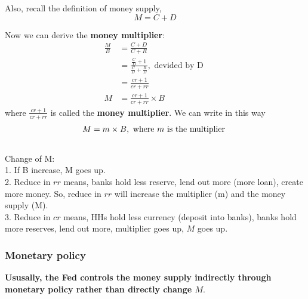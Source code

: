 \documentclass[12pt]{article}
\begin{document}
Also, recall the definition of money supply,
\begin{equation*}
M = C + D
\end{equation*}

Now we can derive the {\textbf {money multiplier}}:
\begin{align*}
\frac{M}{B} &= \frac{C + D}{C + R}\\
 &= \frac{ \frac{C}{D} + 1}{ \frac{C}{D} + \frac{R}{D}}, \text{ devided by D }\\
 &= \frac{cr + 1}{cr + rr}\\
M &= \frac{cr + 1}{cr + rr} \times B
\end{align*}
where $ \frac{cr + 1}{cr + rr} $ is called the {\textbf {money multiplier}}. We can
write in this way
\begin{equation*}
M = m  \times B, \text{ where $ m $ is the multiplier }
\end{equation*}
\noindent{}\\

Change of M:\\
1. If B increase, M goes up.\\
2. Reduce in $ rr $ means, banks hold less reserve, lend out more (more loan),
create more money. So, reduce in $ rr $ will increase the multiplier (m) and the money 
supply (M).\\
3. Reduce in $ cr $ means, HHs hold less currency (deposit into banks), banks hold more
reserves, lend out more, multiplier goes up, $ M $ goes up.



\subsubsection{Monetary policy}

{\textbf {Ususally, the Fed controls the money supply indirectly through monetary
policy rather than directly change $ M $}}.
\end{document}
